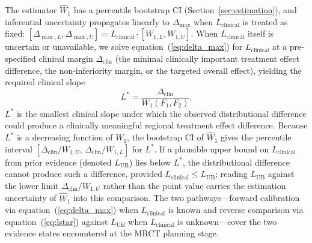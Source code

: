 \documentclass[AMA,Times1COL]{WileyNJDv5}
\begin{document}
The estimator $\widehat{W}_1$ has a percentile bootstrap CI (Section~\ref{sec:estimation}), and inferential uncertainty propagates linearly to $\Delta_{\max}$ when $L_{\text{clinical}}$ is treated as fixed: $[\Delta_{\max,L}, \Delta_{\max,U}] = L_{\text{clinical}} \cdot [W_{1,L}, W_{1,U}]$. When $L_{\text{clinical}}$ itself is uncertain or unavailable, we solve equation~(\ref{eq:delta_max}) for $L_{\text{clinical}}$ at a pre-specified clinical margin $\Delta_{\text{clin}}$ (the minimal clinically important treatment effect difference, the non-inferiority margin, or the targeted overall effect), yielding the required clinical slope
\begin{equation}
L^* = \frac{\Delta_{\text{clin}}}{W_1(F_1, F_2)}.
\label{eq:lstar}
\end{equation}
$L^*$ is the smallest clinical slope under which the observed distributional difference could produce a clinically meaningful regional treatment effect difference. Because $L^*$ is a decreasing function of $W_1$, the bootstrap CI of $\widehat{W}_1$ gives the percentile interval $[\Delta_{\text{clin}}/W_{1,U},\, \Delta_{\text{clin}}/W_{1,L}]$ for $L^*$. If a plausible upper bound on $L_{\text{clinical}}$ from prior evidence (denoted $L_{\text{UB}}$) lies below $L^*$, the distributional difference cannot produce such a difference, provided $L_{\text{clinical}} \leq L_{\text{UB}}$; reading $L_{\text{UB}}$ against the lower limit $\Delta_{\text{clin}}/W_{1,U}$ rather than the point value carries the estimation uncertainty of $\widehat{W}_1$ into this comparison. The two pathways---forward calibration via equation~(\ref{eq:delta_max}) when $L_{\text{clinical}}$ is known and reverse comparison via equation~(\ref{eq:lstar}) against $L_{\text{UB}}$ when $L_{\text{clinical}}$ is unknown---cover the two evidence states encountered at the MRCT planning stage.
\end{document}
